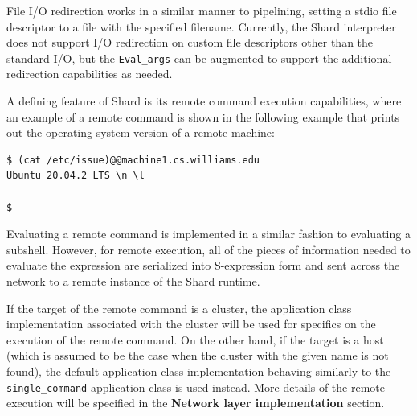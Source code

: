 \documentclass[oneside]{report}
\newcommand{\todoi}[1]{\todo[inline, color=blue!20]{TODO: {#1}}}
\begin{document}
File I/O redirection works in a similar manner to pipelining, setting a stdio file descriptor to a file with the specified filename.
Currently, the Shard interpreter does not support I/O redirection on custom file descriptors other than the standard I/O, but the \texttt{Eval\_args} can be augmented to support the additional redirection capabilities as needed.

A defining feature of Shard is its remote command execution capabilities, where an example of a remote command is shown in the following example that prints out the operating system version of a remote machine:

\begin{minipage}[c]{\textwidth-15pt}
  \begin{lstlisting}[language=shard]
$ (cat /etc/issue)@@machine1.cs.williams.edu
Ubuntu 20.04.2 LTS \n \l

$
\end{lstlisting}
  \smallskip
\end{minipage}

Evaluating a remote command is implemented in a similar fashion to evaluating a subshell.
However, for remote execution, all of the pieces of information needed to evaluate the expression are serialized into S-expression form and sent across the network to a remote instance of the Shard runtime.

If the target of the remote command is a cluster, the application class implementation associated with the cluster will be used for specifics on the execution of the remote command.
On the other hand, if the target is a host (which is assumed to be the case when the cluster with the given name is not found), the default application class implementation behaving similarly to the \texttt{single\_command} application class is used instead.
More details of the remote execution will be specified in the \textbf{Network layer implementation} section.

\end{document}

